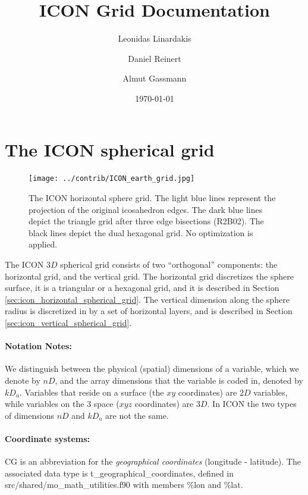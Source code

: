 \documentclass[a4paper,11pt,DIV16,BCOR1cm,titlepage]{scrartcl}
\title{\vspace{6cm}ICON Grid Documentation}
\author[1]{Leonidas Linardakis}
\author[2]{Daniel Reinert}
\author[1]{Almut Gassmann}
\affil[1]{Max-Planck-Institut f\"ur Meteorologie\\Bundesstr. 53\\D-20146 Hamburg\\Germany}
\affil[2]{Deutscher Wetterdienst\\Frankfurter Str. 135\\D-63067 Offenbach\\Germany}
\date{\vspace{8cm}\today}
\begin{document}
  

\maketitle  
  
\tableofcontents  
  
\newpage  

\section{The ICON spherical grid}
\label{sec:icon_spherical_grid}

\begin{figure}[!ht]
  \begin{center}
    \texttt{[image: ../contrib/ICON\_earth\_grid.jpg]}
  \end{center}
  \caption{The ICON horizontal sphere grid. The light blue lines represent the projection of
    the original icosahedron edges. The dark blue lines depict the triangle grid
  after three edge bisections (R2B02). The black lines depict the dual hexagonal grid. 
  No optimization is applied.}
  \label{fig:icon_earth_grid}
\end{figure}

The ICON $3D$ spherical grid consists of two ``orthogonal'' components:
the horizontal grid,  and the vertical grid. 
The horizontal grid  discretizes the sphere surface, 
it is a triangular or a hexagonal grid, and 
it is described in Section \ref{sec:icon_horizontal_spherical_grid}.
The vertical dimension along the sphere radius
is discretized in by a set of horizontal layers, 
and is described in Section \ref{sec:icon_vertical_spherical_grid}.


\paragraph{Notation Notes:}
We distinguish between the physical (spatial) dimensions of a variable, which we denote 
by $nD$,  and the array dimensions that the variable is coded in, denoted by $kD_a$.
Variables that reside on a surface (the $xy$ coordinates) are $2D$ variables, 
while variables on the 3 space ($xyz$ coordinates) are $3D$.
In ICON the two types of dimensions $nD$ and $kD_a$ are not the same.

\paragraph{Coordinate systems:}
CG is an abbreviation for the \emph{geographical coordinates} (longitude - latitude). 
The associated data type is t\_geographical\_coordinates, defined in 
\linebreak src/shared/mo\_math\_utilities.f90 with members \%lon and  \%lat.
\end{document}
